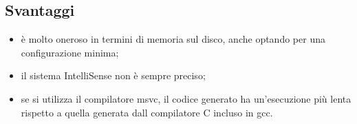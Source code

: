 \subsection*{Svantaggi}
\begin{itemize}
	\item è molto oneroso in termini di memoria sul disco, anche optando per una configurazione minima;
	\item il sistema IntelliSense non è sempre preciso;
	\item se si utilizza il compilatore \gls{msvc}, il codice generato ha un'esecuzione più lenta rispetto a quella generata dall compilatore C incluso in \gls{gcc}.
\end{itemize}



 
